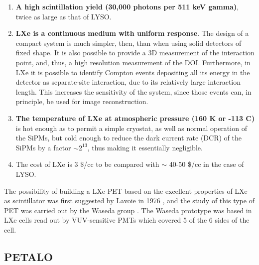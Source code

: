 \documentclass[review]{elsarticle}
\begin{document}
\begin{enumerate}
\item {\bf A high scintillation yield (30,000 photons per 511 keV gamma)}, twice as large as that of LYSO. 
\item {\bf LXe is a continuous medium with uniform response}. The design of a compact system is much simpler, then, than when using solid detectors of fixed shape. It is also possible to provide a 3D measurement of the interaction point, and, thus, a high resolution measurement of the DOI. Furthermore, in LXe it is possible to identify Compton events depositing all its energy in the detector as separate-site interaction, due to its relatively large interaction length. This increases the sensitivity of the system, since those events can, in principle, be used for image reconstruction. 
\item {\bf The temperature of LXe at atmospheric pressure (160 K or -113 C)} is hot enough as to permit a simple cryostat, as well as normal operation of the SiPMs, but cold enough to reduce the dark current rate (DCR) of the SiPMs by a factor $\sim 2^{13}$, thus making it essentially negligible. 
\item {The cost} of LXe is 3 \$/cc to be compared with $\sim$ 40-50 \$/cc in the case of LYSO. 
 \end{enumerate}

The possibility of building a LXe PET based on the excellent properties of LXe as scintillator was first suggested by Lavoie in 1976 \cite{lavoie}, and the study of this type of PET was carried out by the Waseda group \cite{Doke1,Nishikido2,Nishikido1}. The Waseda prototype was based in LXe cells read out by VUV-sensitive PMTs which covered 5 of the 6 sides of the cell. 

\subsection*{PETALO}
\end{document}
